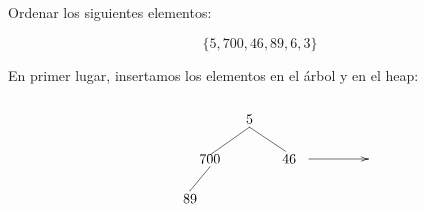 

% 

Ordenar los siguientes elementos:

\begin{displaymath}
\{5, 700, 46, 89, 6, 3\}
\end{displaymath}

En primer lugar, insertamos los elementos en el árbol y en el heap:

\begin{minipage}{0.3\textwidth}
\[\begin{xy}
,(0,0)*+=<10mm>[]\txt<2cm>{5}
,(-10,-10)*+=<10mm>[]\txt<2cm>{700}
,(10,-10)*+=<10mm>[]\txt<2cm>{46}
,(-15,-20)*+=<10mm>[]\txt<2cm>{89}

\ar@{->} (15,-10);(30,-10)
\ar@{-} (0,-2);(-10,-9) %
\ar@{-} (0,-2);(9,-8) %
\ar@{-} (-10,-12);(-15,-18) %
\end{xy}\]
\end{minipage}
